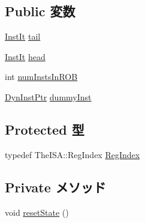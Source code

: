 \subsection*{Public 変数}
\begin{DoxyCompactItemize}
\item 
\hyperlink{classROB_a59263e64bd60700e053c0be08e7c93ab}{InstIt} \hyperlink{classROB_a20dbd4d473546ec8b674542f765626e5}{tail}
\item 
\hyperlink{classROB_a59263e64bd60700e053c0be08e7c93ab}{InstIt} \hyperlink{classROB_ae6c12b73bfe6227eded2623bf432805b}{head}
\item 
int \hyperlink{classROB_a191acd130c66ac40c8bfa8f59febe417}{numInstsInROB}
\item 
\hyperlink{classROB_a028ce10889c5f6450239d9e9a7347976}{DynInstPtr} \hyperlink{classROB_a3f3e1afdb445d65050c39300f93716d2}{dummyInst}
\end{DoxyCompactItemize}
\subsection*{Protected 型}
\begin{DoxyCompactItemize}
\item 
typedef TheISA::RegIndex \hyperlink{classROB_a36d25e03e43fa3bb4c5482cbefe5e0fb}{RegIndex}
\end{DoxyCompactItemize}
\subsection*{Private メソッド}
\begin{DoxyCompactItemize}
\item 
void \hyperlink{classROB_a755ee993c2d4e9d422c37990b15afa37}{resetState} ()
\end{DoxyCompactItemize}
